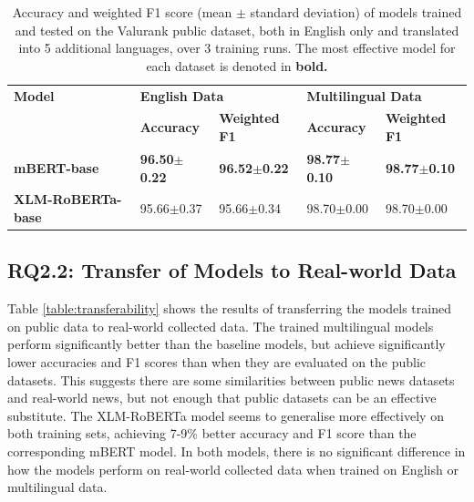 \documentclass{l4proj}
\begin{document}
\begin{table}[h]
\begin{tabular}{lllll}
\hline
\textbf{Model}   & \multicolumn{2}{l}{\textbf{English Data}} & \multicolumn{2}{l}{\textbf{Multilingual Data}} \\ \cline{2-5} 
                 & \textbf{Accuracy}    & \textbf{Weighted F1}   & \textbf{Accuracy}   & \textbf{Weighted F1}   \\ \hline 
\textbf{mBERT-base}       & \textbf{96.50$\pm$0.22}    & \textbf{96.52$\pm$0.22}          & \textbf{98.77$\pm$0.10}       & \textbf{98.77$\pm$0.10}          \\
\textbf{XLM-RoBERTa-base} & 95.66$\pm$0.37    & 95.66$\pm$0.34          & 98.70$\pm$0.00       & 98.70$\pm$0.00   
     \\ \hline
\end{tabular}
\caption{Accuracy and weighted F1 score (mean $\pm$ standard deviation) of models trained and tested on the Valurank public dataset, both in English only and translated into 5 additional languages, over 3 training runs. The most effective model for each dataset is denoted in \textbf{bold.}}
\label{table:backtranslation-effectiveness}
\end{table}

\subsection{RQ2.2: Transfer of Models to Real-world Data}  \hfill \par

Table \ref{table:transferability} shows the results of transferring the models trained on public data to real-world collected data. The trained multilingual models perform significantly better than the baseline models, but achieve significantly lower accuracies and F1 scores than when they are evaluated on the public datasets. This suggests there are some similarities between public news datasets and real-world news, but not enough that public datasets can be an effective substitute. The XLM-RoBERTa model seems to generalise more effectively on both training sets, achieving 7-9\% better accuracy and F1 score than the corresponding mBERT model. In both models, there is no significant difference in how the models perform on real-world collected data when trained on English or multilingual data.
\end{document}
